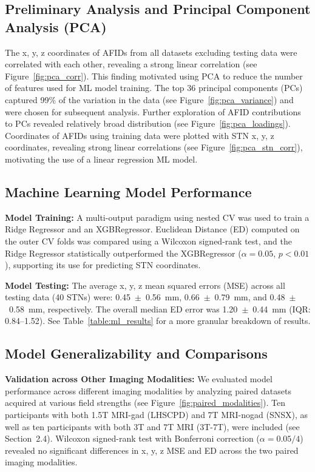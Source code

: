 \subsection{Preliminary Analysis and Principal Component Analysis (PCA)}
The x, y, z coordinates of AFIDs from all datasets excluding testing data were correlated with each other, revealing a strong linear correlation (see Figure~\ref{fig:pca_corr}). This finding motivated using PCA to reduce the number of features used for ML model training. The top 36 principal components (PCs) captured 99\% of the variation in the data (see Figure~\ref{fig:pca_variance}) and were chosen for subsequent analysis. Further exploration of AFID contributions to PCs revealed relatively broad distribution (see Figure~\ref{fig:pca_loadings}). Coordinates of AFIDs using training data were plotted with STN x, y, z coordinates, revealing strong linear correlations (see Figure~\ref{fig:pca_stn_corr}), motivating the use of a linear regression ML model.

\subsection{Machine Learning Model Performance}
\textbf{Model Training:} A multi-output paradigm using nested CV was used to train a Ridge Regressor and an XGBRegressor. Euclidean Distance (ED) computed on the outer CV folds was compared using a Wilcoxon signed-rank test, and the Ridge Regressor statistically outperformed the XGBRegressor ($\alpha = 0.05$, $p < 0.01$), supporting its use for predicting STN coordinates.

\textbf{Model Testing:} The average x, y, z mean squared errors (MSE) across all testing data (40 STNs) were: 0.45~$\pm$~0.56~mm, 0.66~$\pm$~0.79~mm, and 0.48~$\pm$~0.58~mm, respectively. The overall median ED error was 1.20~$\pm$~0.44~mm (IQR: 0.84–1.52). See Table~\ref{table:ml_results} for a more granular breakdown of results.

\subsection{Model Generalizability and Comparisons}

\textbf{Validation across Other Imaging Modalities:} We evaluated model performance across different imaging modalities by analyzing paired datasets acquired at various field strengths (see Figure~\ref{fig:paired_modalities}). Ten participants with both 1.5T MRI-gad (LHSCPD) and 7T MRI-nogad (SNSX), as well as ten participants with both 3T and 7T MRI (3T-7T), were included (see Section~2.4). Wilcoxon signed-rank test with Bonferroni correction ($\alpha = 0.05/4$) revealed no significant differences in x, y, z MSE and ED across the two paired imaging modalities.

